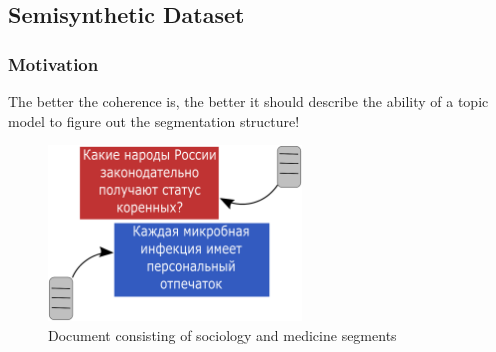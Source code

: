 \documentclass[russian]{beamer}
\begin{document}
\subsection{Semisynthetic Dataset}


\begin{frame}
  \frametitle{Motivation}
  \begin{block}{}
    The better the coherence is, the better it should describe the ability of a topic model to figure out the segmentation structure!
  \end{block}   
  \begin{figure}[h]
    \centering
    \includegraphics[width=0.6\textwidth, height=0.45\textheight]{pn_gen_diagram.eps}
    \caption*{Document consisting of sociology and medicine segments}
  \end{figure}    
\end{frame}
\end{document}
